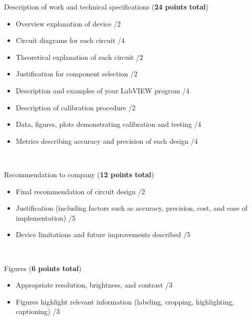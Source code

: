 \documentclass{article}
\begin{document}
Description of work and technical specifications (\textbf{24 points total})
\begin{small}
\begin{itemize}
	\item Overview explanation of device \hfill \underline{\hspace{1cm}}/2
	\item Circuit diagrams for each circuit \hfill \underline{\hspace{1cm}}/4
	\item Theoretical explanation of each circuit \hfill \underline{\hspace{1cm}}/2
	\item Justification for component selection \hfill \underline{\hspace{1cm}}/2
	\item Description and examples of your LabVIEW program \hfill \underline{\hspace{1cm}}/4
	\item Description of calibration procedure \hfill \underline{\hspace{1cm}}/2
	\item Data, figures, plots demonstrating calibration and testing \hfill \underline{\hspace{1cm}}/4
	\item Metrics describing accuracy and precision of each design \hfill \underline{\hspace{1cm}}/4
\end{itemize}	
\end{small}\

Recommendation to company (\textbf{12 points total})
\begin{small}
\begin{itemize}
	\item Final recommendation of circuit design \hfill \underline{\hspace{1cm}}/2
	\item Justification (including factors such as accuracy, precision, cost, and ease of implementation) \hfill \underline{\hspace{1cm}}/5
	\item Device limitations and future improvements described \hfill \underline{\hspace{1cm}}/5
\end{itemize}	
\end{small}\

Figures (\textbf{6 points total})
\begin{small}
\begin{itemize}
	\item Appropriate resolution, brightness, and contrast \hfill \underline{\hspace{1cm}}/3
	\item Figures highlight relevant information (labeling, cropping, highlighting, captioning) \hfill \underline{\hspace{1cm}}/3
\end{itemize}
\end{small}\
\end{document}
